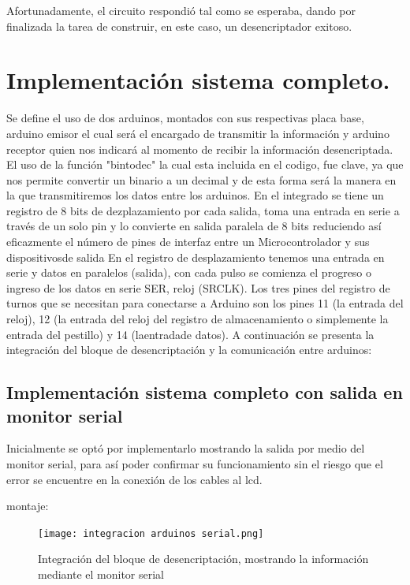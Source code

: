 \documentclass{article}
\begin{document}
Afortunadamente, el circuito respondió tal como se esperaba, dando por finalizada la tarea de construir, en este caso, un desencriptador exitoso.


\section{Implementación sistema completo.} \label{sistema completo}

Se define el uso de dos arduinos, montados con sus respectivas placa base, arduino emisor el cual será el encargado de transmitir la información y arduino receptor quien nos indicará al momento de recibir la información desencriptada. El uso de la función "bintodec" la cual esta incluida en el codigo, fue clave, ya que nos permite convertir un binario a un decimal y de esta forma será la manera en la que transmitiremos los datos entre los arduinos.\newline
En el integrado se tiene un registro de 8 bits de dezplazamiento por cada salida, toma una entrada en serie a través de un solo pin y lo convierte en salida paralela de 8 bits reduciendo así eficazmente el número de pines de interfaz entre un Microcontrolador y sus dispositivosde salida
En el registro de desplazamiento tenemos una entrada en serie y datos en paralelos (salida), con cada pulso se comienza el progreso o 
ingreso de los datos en serie SER, reloj (SRCLK).\newline
Los tres pines del registro de turnos que se necesitan para conectarse a Arduino son los pines 11 (la entrada del reloj), 12 (la entrada del reloj del registro de almacenamiento o simplemente la entrada del pestillo) y 14 (laentradade datos).
A continuación se presenta la integración del bloque de desencriptación y la comunicación entre arduinos:

\newpage
\subsection{Implementación sistema completo con salida en monitor serial}\label{intento1}
Inicialmente se optó por implementarlo mostrando la salida por medio del monitor serial, para así poder confirmar su funcionamiento sin el riesgo que el error se encuentre en la conexión de los cables al lcd.


montaje:
\begin{figure}[h]
\texttt{[image: integracion arduinos serial.png]}
\centering
\caption{Integración del bloque de desencriptación, mostrando la información mediante el monitor serial}
\label{fig:serial}
\end{figure}
\end{document}
